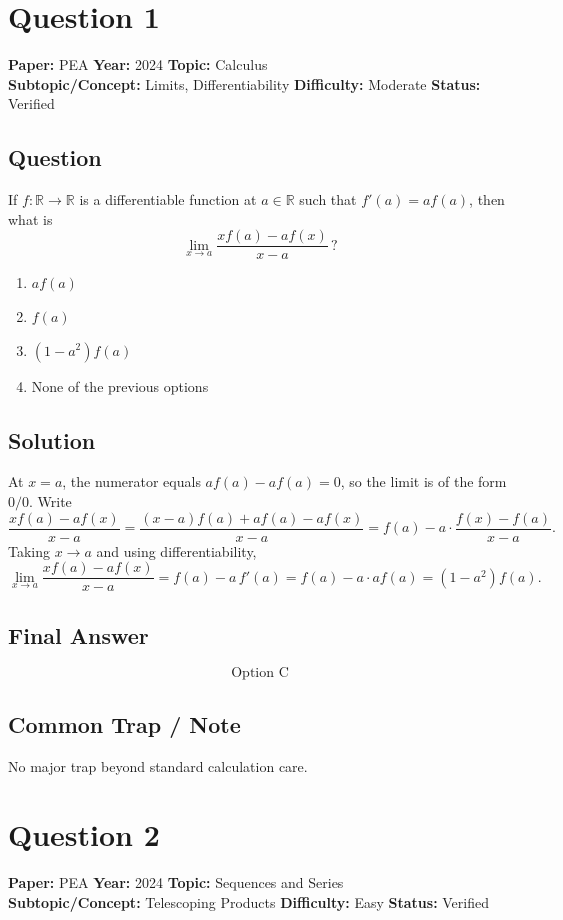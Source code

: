 \documentclass[11pt]{article}
\begin{document}
\newpage

\section*{Question 1}
\textbf{Paper:} PEA \quad \textbf{Year:} 2024 \quad \textbf{Topic:} Calculus \\
\textbf{Subtopic/Concept:} Limits, Differentiability \quad \textbf{Difficulty:} Moderate \quad \textbf{Status:} Verified

\subsection*{Question}
If $f:\mathbb{R}\to\mathbb{R}$ is a differentiable function at $a\in\mathbb{R}$ such that $f'(a)=af(a)$, then what is
\[
\lim_{x\to a}\frac{xf(a)-af(x)}{x-a}\, ?
\]
\begin{enumerate}[label=(\Alph*)]
\item $af(a)$
\item $f(a)$
\item $(1-a^2)f(a)$
\item None of the previous options
\end{enumerate}

\subsection*{Solution}
At $x=a$, the numerator equals $af(a)-af(a)=0$, so the limit is of the form $0/0$. Write
\[
\frac{xf(a)-af(x)}{x-a}
= \frac{(x-a)f(a) + af(a) - af(x)}{x-a}
= f(a) - a\cdot\frac{f(x)-f(a)}{x-a}.
\]
Taking $x\to a$ and using differentiability,
\[
\lim_{x\to a}\frac{xf(a)-af(x)}{x-a}
= f(a) - a\,f'(a)
= f(a) - a\cdot af(a)
= (1-a^{2})f(a).
\]

\subsection*{Final Answer}
\[
\boxed{\text{Option C}}
\]

\subsection*{Common Trap / Note}
No major trap beyond standard calculation care.

\section*{Question 2}
\textbf{Paper:} PEA \quad \textbf{Year:} 2024 \quad \textbf{Topic:} Sequences and Series \\
\textbf{Subtopic/Concept:} Telescoping Products \quad \textbf{Difficulty:} Easy \quad \textbf{Status:} Verified
\end{document}
